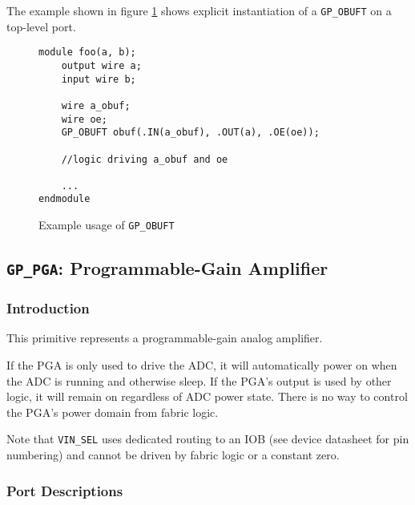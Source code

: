 \documentclass[11pt]{article}
\newcommand{\tokenstyle}[1]{\texttt{#1}}
\begin{document}
The example shown in figure \ref{gp-obuft-example} shows explicit instantiation of a \tokenstyle{GP\_OBUFT} on a top-level port.

\begin{figure}[h]
\begin{lstlisting}
module foo(a, b);
	output wire a;
	input wire b;

	wire a_obuf;
	wire oe;
	GP_OBUFT obuf(.IN(a_obuf), .OUT(a), .OE(oe));

	//logic driving a_obuf and oe

	...
endmodule
\end{lstlisting}
\caption{Example usage of \tokenstyle{GP\_OBUFT}}
\label{gp-obuft-example}
\end{figure}


\pagebreak
\clearpage
\subsection{\tokenstyle{GP\_PGA}: Programmable-Gain Amplifier}

\subsubsection{Introduction}
This primitive represents a programmable-gain analog amplifier.

If the PGA is only used to drive the ADC, it will automatically power on when the ADC is running and otherwise sleep.
If the PGA's output is used by other logic, it will remain on regardless of ADC power state. There is no way to control
the PGA's power domain from fabric logic.

Note that \tokenstyle{VIN\_SEL} uses dedicated routing to an IOB (see device datasheet for pin numbering) and cannot be driven
by fabric logic or a constant zero.

\subsubsection{Port Descriptions}
\end{document}
